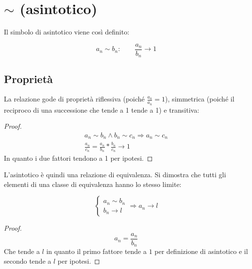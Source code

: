 \section{\texorpdfstring{$\sim$ (asintotico)}{Asintotico}}
Il simbolo di asintotico viene così definito:
\begin{defin}
	\[
		a_n\sim b_n:\qquad\frac{a_n}{b_n}\to1
	\]
\end{defin}


\subsection{Proprietà}
La relazione gode di proprietà riflessiva (poiché $\frac{a_n}{a_n}=1$), simmetrica (poiché il reciproco di una successione che tende a 1 tende a 1) e transitiva:
\begin{proof}
	\begin{gather*}
		a_n\sim b_n\land b_n\sim c_n\Rightarrow a_n\sim c_n\\
		\frac{a_n}{c_n}=\frac{a_n}{b_n}*\frac{b_n}{c_n}\to1
	\end{gather*}
	In quanto i due fattori tendono a 1 per ipotesi.
\end{proof}
L'asintotico è quindi una relazione di equivalenza. Si dimostra che tutti gli elementi di una classe di equivalenza hanno lo stesso limite:
\begin{teor}
	\[
		\begin{cases}
			a_n\sim b_n \\
			b_n\to l
		\end{cases}\Rightarrow a_n\to l
	\]
\end{teor}
\begin{proof}
	\[
		a_n=\frac{a_n}{b_n}
	\]
	Che tende a $l$ in quanto il primo fattore tende a $1$ per definizione di asintotico e il secondo tende a $l$ per ipotesi.
\end{proof}


